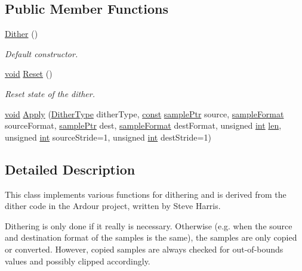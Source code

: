 \subsection*{Public Member Functions}
\begin{DoxyCompactItemize}
\item 
\hyperlink{class_dither_a3d229a9790aeaf00e63121495e2e0b48}{Dither} ()
\begin{DoxyCompactList}\small\item\em Default constructor. \end{DoxyCompactList}\item 
\hyperlink{sound_8c_ae35f5844602719cf66324f4de2a658b3}{void} \hyperlink{class_dither_a39eb37b93d93a262e4beea29488e573a}{Reset} ()
\begin{DoxyCompactList}\small\item\em Reset state of the dither. \end{DoxyCompactList}\item 
\hyperlink{sound_8c_ae35f5844602719cf66324f4de2a658b3}{void} \hyperlink{class_dither_a6c3a234d3ff2ea8dff4fa39b2172f3f5}{Apply} (\hyperlink{class_dither_adea8077a2ba5a6c4ad2f11ed20cd4086}{Dither\+Type} dither\+Type, \hyperlink{getopt1_8c_a2c212835823e3c54a8ab6d95c652660e}{const} \hyperlink{include_2audacity_2_types_8h_aaafb46d1caf7c79262fec96b577215fe}{sample\+Ptr} source, \hyperlink{include_2audacity_2_types_8h_a9938d2e2f6adef23e745cd80ef379792}{sample\+Format} source\+Format, \hyperlink{include_2audacity_2_types_8h_aaafb46d1caf7c79262fec96b577215fe}{sample\+Ptr} dest, \hyperlink{include_2audacity_2_types_8h_a9938d2e2f6adef23e745cd80ef379792}{sample\+Format} dest\+Format, unsigned \hyperlink{xmltok_8h_a5a0d4a5641ce434f1d23533f2b2e6653}{int} \hyperlink{lib_2expat_8h_af86d325fecfc8f47b61fbf5a5146f582}{len}, unsigned \hyperlink{xmltok_8h_a5a0d4a5641ce434f1d23533f2b2e6653}{int} source\+Stride=1, unsigned \hyperlink{xmltok_8h_a5a0d4a5641ce434f1d23533f2b2e6653}{int} dest\+Stride=1)
\end{DoxyCompactItemize}


\subsection{Detailed Description}
This class implements various functions for dithering and is derived from the dither code in the Ardour project, written by Steve Harris. 

Dithering is only done if it really is necessary. Otherwise (e.\+g. when the source and destination format of the samples is the same), the samples are only copied or converted. However, copied samples are always checked for out-\/of-\/bounds values and possibly clipped accordingly.

